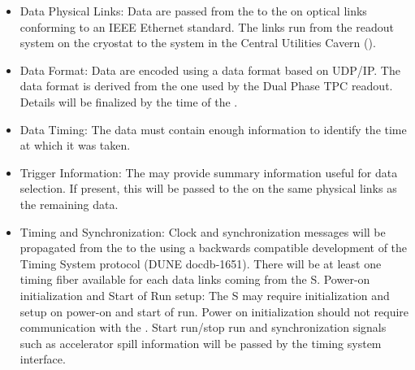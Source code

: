 \begin{itemize}

\item Data Physical Links: Data are passed from the  to the  on optical links conforming to an IEEE Ethernet standard. The links run from the  readout system on the cryostat to the  system in the Central Utilities Cavern ().

\item Data Format: Data are encoded using a data format based on UDP/IP. The data format is derived from the one used by the Dual Phase TPC readout. Details will be finalized by the time of the  .

\item Data Timing: The data must contain enough information to identify the time  at which it was taken.

\item Trigger Information: The  may provide summary information useful for data selection. If present, this will be passed to the  on the same physical links as the remaining data.

\item Timing and Synchronization: Clock and synchronization messages will be propagated from the  to the  using a backwards compatible development of the  Timing System protocol (DUNE docdb-1651). There will be at least one timing fiber available for each data links coming from the S. Power-on initialization and Start of Run setup:  The S may require initialization and setup on power-on and start of run. Power on initialization should not require communication with the . Start run/stop run and synchronization signals such as accelerator spill information will be passed by the timing system interface.

\end{itemize}



